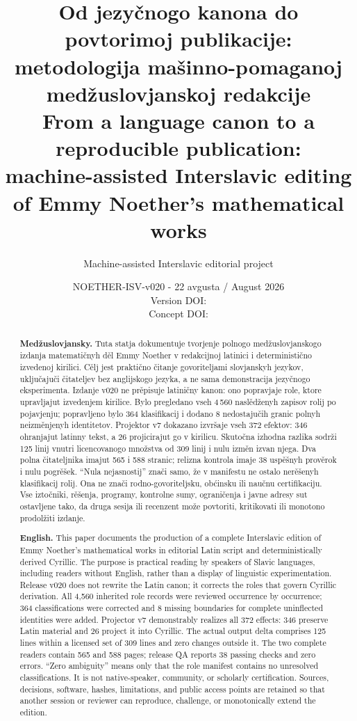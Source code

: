 \documentclass[11pt]{article}
\title{\sffamily\bfseries\color{NoetherBlue}
Od jezyčnogo kanona do povtorimoj publikacije:\\
metodologija mašinno-pomaganoj medžuslovjanskoj redakcije\\[0.65em]
\large From a language canon to a reproducible publication:\\
machine-assisted Interslavic editing of Emmy Noether's mathematical works}
\author{Machine-assisted Interslavic editorial project}
\date{NOETHER-ISV-v020 - 22 avgusta / August 2026\\
Version DOI: \doiurl{10.5281/zenodo.22058530}\\
Concept DOI: \doiurl{10.5281/zenodo.21926382}}
\begin{document}
\maketitle

\begin{abstract}
\noindent\textbf{Medžuslovjansky.}
Tuta statja dokumentuje tvorjenje polnogo medžuslovjanskogo izdanja matematičnyh děl Emmy Noether v redakcijnoj latinici i deterministično izvedenoj kirilici. Cělj jest praktično čitanje govoriteljami slovjanskyh jezykov, uključajuči čitateljev bez anglijskogo jezyka, a ne sama demonstracija jezyčnogo eksperimenta. Izdanje v020 ne prěpisuje latiničny kanon: ono popravjaje role, ktore upravljajut izvedenjem kirilice. Bylo pregledano vseh 4\,560 naslědženyh zapisov rolij po pojavjenju; popravljeno bylo 364 klasifikacij i dodano 8 nedostajučih granic polnyh neizměnjenyh identitetov. Projektor v7 dokazano izvršaje vseh 372 efektov: 346 ohranjajut latinny tekst, a 26 projicirajut go v kirilicu. Skutočna izhodna razlika sodrži 125 linij vnutri licencovanogo množstva od 309 linij i nulu izměn izvan njega. Dva polna čitateljnika imajut 565 i 588 stranic; relizna kontrola imaje 38 uspěšnyh prověrok i nulu pogrěšek. ``Nula nejasnostij'' znači samo, že v manifestu ne ostalo nerěšenyh klasifikacij rolij. Ona ne znači rodno-govoriteljsku, obćinsku ili naučnu certifikaciju. Vse iztočniki, rěšenja, programy, kontrolne sumy, ograničenja i javne adresy sut ostavljene tako, da druga sesija ili recenzent može povtoriti, kritikovati ili monotono prodolžiti izdanje.

\medskip
\noindent\textbf{English.}
This paper documents the production of a complete Interslavic edition of Emmy Noether's mathematical works in editorial Latin script and deterministically derived Cyrillic. The purpose is practical reading by speakers of Slavic languages, including readers without English, rather than a display of linguistic experimentation. Release v020 does not rewrite the Latin canon; it corrects the roles that govern Cyrillic derivation. All 4,560 inherited role records were reviewed occurrence by occurrence; 364 classifications were corrected and 8 missing boundaries for complete uninflected identities were added. Projector v7 demonstrably realizes all 372 effects: 346 preserve Latin material and 26 project it into Cyrillic. The actual output delta comprises 125 lines within a licensed set of 309 lines and zero changes outside it. The two complete readers contain 565 and 588 pages; release QA reports 38 passing checks and zero errors. ``Zero ambiguity'' means only that the role manifest contains no unresolved classifications. It is not native-speaker, community, or scholarly certification. Sources, decisions, software, hashes, limitations, and public access points are retained so that another session or reviewer can reproduce, challenge, or monotonically extend the edition.
\end{abstract}
\end{document}
